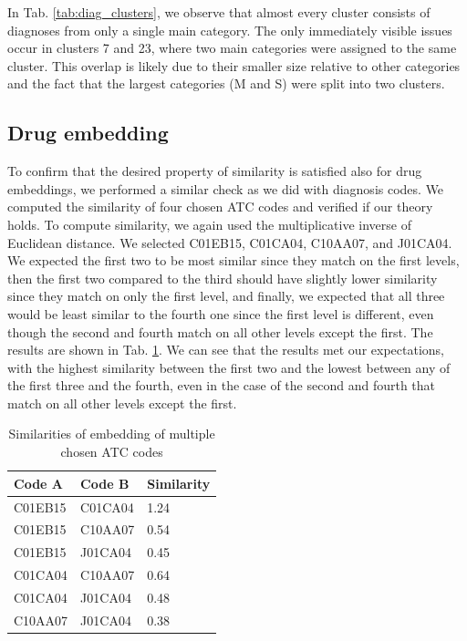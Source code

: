 In Tab. \ref{tab:diag_clusters}, we observe that almost every cluster consists of diagnoses from only a single main category. The only immediately visible issues occur in clusters 7 and 23, where two main categories were assigned to the same cluster. This overlap is likely due to their smaller size relative to other categories and the fact that the largest categories (M and S) were split into two clusters.

\subsection{Drug embedding}

To confirm that the desired property of similarity is satisfied also for drug embeddings, we performed a similar check as we did with diagnosis codes. We computed the similarity of four chosen ATC codes and verified if our theory holds. To compute similarity, we again used the multiplicative inverse of Euclidean distance. We selected C01EB15, C01CA04, C10AA07, and J01CA04. We expected the first two to be most similar since they match on the first levels, then the first two compared to the third should have slightly lower similarity since they match on only the first level, and finally, we expected that all three would be least similar to the fourth one since the first level is different, even though the second and fourth match on all other levels except the first. The results are shown in Tab. \ref{tab:drug_emb_show}. We can see that the results met our expectations, with the highest similarity between the first two and the lowest between any of the first three and the fourth, even in the case of the second and fourth that match on all other levels except the first.

\begin{table}[!h]
	\centering
	\begin{tabular}{|l|l|l|}
		\hline
		Code A & Code B & Similarity \\ \hline
		C01EB15 & C01CA04 & 1.24      \\ \hline
		C01EB15 & C10AA07 & 0.54       \\ \hline
		C01EB15 & J01CA04 & 0.45       \\ \hline
		C01CA04 & C10AA07 & 0.64       \\ \hline
		C01CA04 & J01CA04 & 0.48       \\ \hline
		C10AA07 & J01CA04 & 0.38       \\ \hline
	\end{tabular}
	\caption{Similarities of embedding of multiple chosen ATC codes}
	\label{tab:drug_emb_show}
\end{table}  

